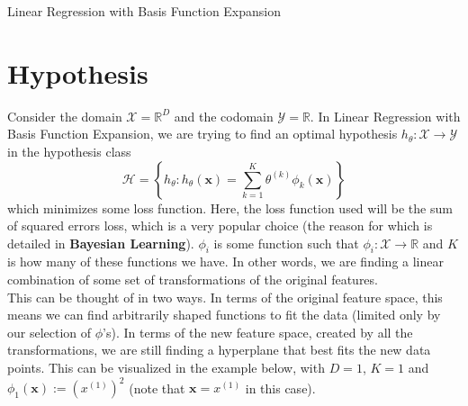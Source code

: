 \documentclass[12pt]{article}
\newcommand{\curly}[1]{\left\{#1\right\}}
\begin{document}
\begin{center}
	\LARGE{Linear Regression with Basis Function Expansion}
\end{center}

\section{Hypothesis}

Consider the domain $\mathcal{X} = \mathbb{R}^D$ and the codomain  $\mathcal{Y} = \mathbb{R}$. In Linear Regression with Basis Function Expansion, we are trying to find an optimal hypothesis $h_\theta : \mathcal{X} \rightarrow \mathcal{Y}$ in the hypothesis class
\[ \mathcal{H} = \curly{h_\theta : h_\theta(\mathbf{x}) = \sum_{k=1}^K\theta^{(k)}\phi_k(\mathbf{x})} \]
which minimizes some loss function. Here, the loss function used will be the sum of squared errors loss, which is a very popular choice (the reason for which is detailed in \textbf{Bayesian Learning}). $\phi_i$ is some function such that $\phi_i : \mathcal{X} \rightarrow \mathbb{R}$ and $K$ is how many of these functions we have. In other words, we are finding a linear combination of some set of transformations of the original features.
\\\newline
This can be thought of in two ways. In terms of the original feature space, this means we can find arbitrarily shaped functions to fit the data (limited only by our selection of $\phi$'s). In terms of the new feature space, created by all the transformations, we are still finding a hyperplane that best fits the new data points. This can be visualized in the example below, with $D=1$, $K=1$ and $\phi_1(\mathbf{x}) := (x^{(1)})^2$ (note that $\mathbf{x} = x^{(1)}$ in this case).

\begin{center}
	\quad
\end{center}
\end{document}
